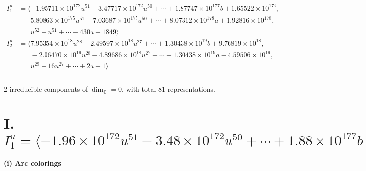 \documentclass[1p]{elsarticle_modified}
\theoremstyle{definition}
\begin{document}
\begin{align*}
I^u_{1}&=\langle 
-1.95711\times10^{172} u^{51}-3.47717\times10^{172} u^{50}+\cdots+1.87747\times10^{177} b+1.65522\times10^{176},\\
\phantom{I^u_{1}}&\phantom{= \langle  }5.80863\times10^{175} u^{51}+7.03687\times10^{175} u^{50}+\cdots+8.07312\times10^{178} a+1.92816\times10^{178},\\
\phantom{I^u_{1}}&\phantom{= \langle  }u^{52}+u^{51}+\cdots-430 u-1849\rangle \\
I^u_{2}&=\langle 
7.95354\times10^{18} u^{28}-2.49597\times10^{18} u^{27}+\cdots+1.30438\times10^{19} b+9.76819\times10^{18},\\
\phantom{I^u_{2}}&\phantom{= \langle  }-2.06470\times10^{19} u^{28}-4.89686\times10^{18} u^{27}+\cdots+1.30438\times10^{19} a-4.59506\times10^{19},\\
\phantom{I^u_{2}}&\phantom{= \langle  }u^{29}+16 u^{27}+\cdots+2 u+1\rangle \\
\\
\end{align*}
\raggedright * 2 irreducible components of $\dim_{\mathbb{C}}=0$, with total 81 representations.\\
\newpage
\renewcommand{\arraystretch}{1}
\centering \section*{I. $I^u_{1}= \langle -1.96\times10^{172} u^{51}-3.48\times10^{172} u^{50}+\cdots+1.88\times10^{177} b+1.66\times10^{176},\;5.81\times10^{175} u^{51}+7.04\times10^{175} u^{50}+\cdots+8.07\times10^{178} a+1.93\times10^{178},\;u^{52}+u^{51}+\cdots-430 u-1849 \rangle$}
\flushleft \textbf{(i) Arc colorings}\\
\end{document}
